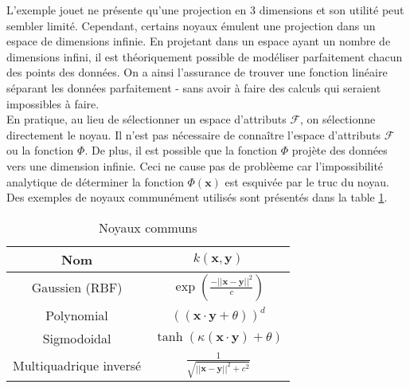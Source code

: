 L'exemple jouet ne présente qu’une projection en 3 dimensions et son utilité peut sembler limité. Cependant, certains noyaux émulent une projection dans un espace de dimensions infinie. 
En projetant dans un espace ayant un nombre de dimensions infini, il est théoriquement possible de modéliser 
parfaitement chacun des points des données. On a ainsi l’assurance de trouver une fonction linéaire séparant les 
données parfaitement - sans avoir à faire des calculs qui seraient impossibles à faire.\\

En pratique, au lieu de sélectionner un espace d'attributs $\mathcal{F}$, on sélectionne directement le noyau. 
Il n'est pas nécessaire de connaître l'espace d'attributs $\mathcal{F}$ ou la fonction $\Phi$. De plus, 
il est possible que la fonction $\Phi$ projète des données vers une dimension infinie. Ceci ne cause pas de problèeme car 
l'impossibilité analytique de déterminer la fonction $\Phi(\textbf{x})$ est esquivée par 
le truc du noyau. Des exemples de noyaux communément utilisés sont présentés dans la table \ref{tab:kernels}.

\begin{table}[H]
	\centering
\begin{tabular}{|c|c|}
	\hline
	         Nom           &                  $k(\textbf{x}, \textbf{y})$                  \\ \hline
	    Gaussien (RBF)     & $\exp \left(\frac{-|| \textbf{x} - \textbf{y}||^2}{c}\right)$ \\ \hline
	      Polynomial       &         $((\textbf{x} \cdot \textbf{y} + \theta))^d$          \\ \hline
	     Sigmodoidal       &    $\tanh (\kappa (\textbf{x} \cdot \textbf{y}) + \theta)$    \\ \hline
	Multiquadrique inversé &     $\frac{1}{\sqrt{||\textbf{x}-\textbf{y}||^2 + c^2}}$      \\ \hline
\end{tabular} 
\caption{Noyaux communs}
\label{tab:kernels}
\end{table}
